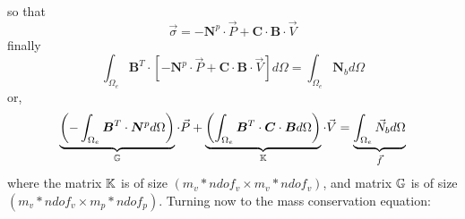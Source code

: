 so that
\begin{equation}
\vec{\sigma} 
= - {\bm N}^p
 \cdot {\vec P}  + 
{\bm C} \cdot  {\bm B}\cdot {\vec V}
\end{equation}
finally
\begin{equation}
\int_{\Omega_e} {\bm B}^T \cdot 
[
- {\bm N}^p  \cdot {\vec P}  + {\bm C} \cdot  {\bm B}\cdot {\vec V}
]
d\Omega
=
\int_{\Omega_e} {\bm N}_b d\Omega 
\end{equation}
or,
\begin{equation}
\underbrace{\left(-\int_{\Omega_e} {\bm B}^T \cdot 
{\bm N}^p  
d\Omega \right)}_{{\mathbb{G}}} \cdot {\vec P} 
+
\underbrace{
\left(
\int_{\Omega_e} {\bm B}^T \cdot 
{\bm C} \cdot  {\bm B}
d\Omega
\right)}_{{\mathbb{K}}}
\cdot {\vec V}
=
\underbrace{\int_{\Omega_e} {\vec N}_b d\Omega }_{\vec f}
\end{equation}
where the matrix ${\mathbb{K}}$ is of size $(m_v*ndof_v \times m_v*ndof_v)$, 
and matrix ${{\mathbb{G}}}$ is of size $(m_v*ndof_v \times m_p*ndof_p)$.
Turning now to the mass conservation equation:

